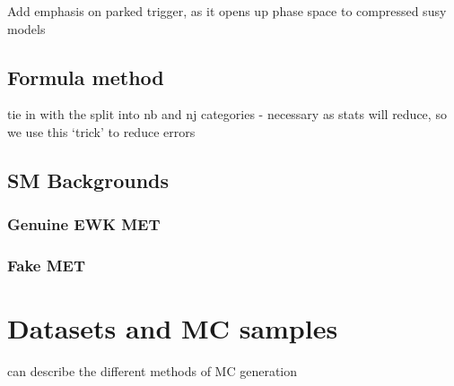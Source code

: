 Add emphasis on parked trigger, as it opens up phase space to compressed susy models

\subsection{Formula method}

tie in with the split into nb and nj categories - necessary as stats will reduce, so we use
this `trick' to reduce errors

\subsection{SM Backgrounds}
\subsubsection{Genuine EWK MET}
\subsubsection{Fake MET}



\section{Datasets and MC samples}

can describe the different methods of MC generation